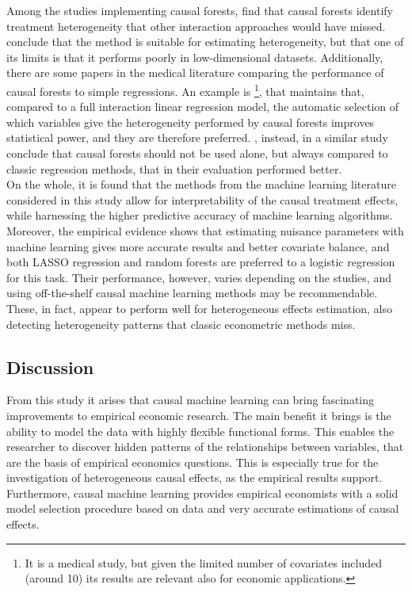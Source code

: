 \documentclass[12pt,a4paper,openright,twoside]{book}
\begin{document}
\begin{doublespacing}
Among the studies implementing causal forests, \citet{davisetal} find that causal forests identify treatment heterogeneity that other interaction approaches would have missed. \citet{bonanderetal} conclude that the method is suitable for estimating heterogeneity, but that one of its limits is that it performs poorly in low-dimensional datasets. 
Additionally, there are some papers in the medical literature comparing the performance of causal forests  to simple regressions. An example is \citet{elek2021regional}\footnote{It is a medical study, but given the limited number of covariates included (around 10) its results are relevant also for economic applications.}, that maintains that, compared to a full interaction linear regression model, the automatic selection of which variables give the heterogeneity performed by causal forests improves statistical power, and they are therefore preferred. \citet{venkatasubramaniam2023comparison}, instead, in a similar study conclude that causal forests should not be used alone, but always compared to classic regression methods, that in their evaluation performed better. \\

On the whole, it is found that the methods from the machine learning literature considered in this study allow for interpretability of the causal treatment effects, while harnessing the higher predictive accuracy of machine learning algorithms. Moreover, the empirical evidence shows that estimating nuisance parameters with machine learning gives more accurate results and better covariate balance, and both LASSO regression and random forests are preferred to a logistic regression for this task. Their performance, however, varies depending on the studies, and using off-the-shelf causal machine learning methods may be recommendable. These, in fact, appear to perform well for heterogeneous effects estimation, also detecting heterogeneity patterns that classic econometric methods miss. 

\subsection{Discussion}

From this study it arises that causal machine learning can bring fascinating improvements to empirical economic research. 
The main benefit it brings is the ability to model the data with highly flexible functional forms. This enables the researcher to discover hidden patterns of the relationships between variables, that are the basis of empirical economics questions. This is especially true for the investigation of heterogeneous causal effects, as the empirical results support. Furthermore, causal machine learning provides empirical economists with a solid model selection procedure based on data and very accurate estimations of causal effects. 


\end{doublespacing}
\end{document}
